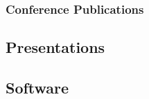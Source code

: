 \documentclass[letterpaper, 11pt]{article}
\begin{document}
\subsubsection*{Conference Publications}
\renewcommand*{\labelenumi}{[C\theenumi]}

\subsection*{Presentations}
\renewcommand*{\labelenumi}{[T\theenumi]}

\subsection*{Software}
\end{document}
